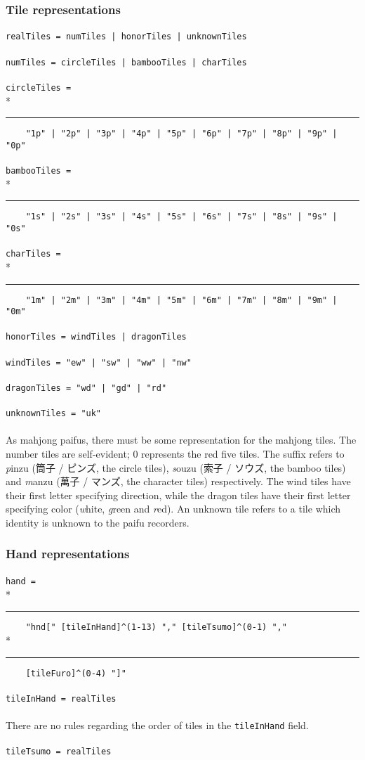\documentclass[%
	a4paper%
	,10pt%
	,twoside%
	,notitlepage%
]{article}%
\newcommand*{\ruleSymbol}{\textjapanese{⚠}}%
\newcommand*{\ruleMargin}{\marginpar{\flushright{}\ruleSymbol{}}}%
\newcommand*{\rulePar}{\paragraph*{\ruleMargin{}}}%
\newcommand*{\indentRule}{\rule{10pt}{0pt}}%
\begin{document}
		\subsubsection{Tile representations}\label{subsubsec:tile}%
			\rulePar{}\lstinline/realTiles = numTiles | honorTiles | unknownTiles/%
			\rulePar{}\lstinline/numTiles = circleTiles | bambooTiles | charTiles/%
			\rulePar{}\lstinline/circleTiles = /\\*{}%
			\indentRule{}\lstinline/    "1p" | "2p" | "3p" | "4p" | "5p" | "6p" | "7p" | "8p" | "9p" | "0p"/%
			\rulePar{}\lstinline/bambooTiles = /\\*{}%
			\indentRule{}\lstinline/    "1s" | "2s" | "3s" | "4s" | "5s" | "6s" | "7s" | "8s" | "9s" | "0s"/%
			\rulePar{}\lstinline/charTiles = /\\*{}%
			\indentRule{}\lstinline/    "1m" | "2m" | "3m" | "4m" | "5m" | "6m" | "7m" | "8m" | "9m" | "0m"/%
			\rulePar{}\lstinline/honorTiles = windTiles | dragonTiles/%
			\rulePar{}\lstinline/windTiles = "ew" | "sw" | "ww" | "nw"/%
			\rulePar{}\lstinline/dragonTiles = "wd" | "gd" | "rd"/%
			\rulePar{}\lstinline/unknownTiles = "uk"/%
			\paragraph*{}As mahjong paifus, there must be some representation for the mahjong tiles. The number tiles are self-evident; 0 represents the red five tiles. The suffix refers to \textit{p\/}inzu (\textjapanese{筒子} / \textjapanese{ピンズ}, the circle tiles), \textit{s\/}ouzu (\textjapanese{索子} / \textjapanese{ソウズ}, the bamboo tiles) and \textit{m\/}anzu (\textjapanese{萬子} / \textjapanese{マンズ}, the character tiles) respectively. The wind tiles have their first letter specifying direction, while the dragon tiles have their first letter specifying color (\textit{w\/}hite, \textit{g\/}reen and \textit{r\/}ed). An unknown tile refers to a tile which identity is unknown to the paifu recorders. %
		\subsubsection{Hand representations}\label{subsubsec:hand}%
			\rulePar{}\lstinline/hand = /\\*{}%
			\indentRule{}\lstinline/    "hnd[" [tileInHand]^(1-13) "," [tileTsumo]^(0-1) "," /\\*{}%
			\indentRule{}\lstinline/    [tileFuro]^(0-4) "]"/%
			\rulePar{}\lstinline/tileInHand = realTiles/%
			\rulePar{}There are no rules regarding the order of tiles in the \lstinline/tileInHand/ field. %
			\rulePar{}\lstinline/tileTsumo = realTiles/%
\end{document}
